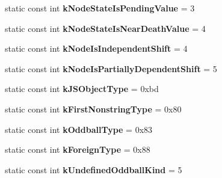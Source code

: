 \begin{DoxyCompactItemize}
\item 
\hypertarget{classv8_1_1internal_1_1Internals_a843b53b17257ecd957eade0d9f21c5ab}{}static const int {\bfseries k\+Node\+State\+Is\+Pending\+Value} = 3\label{classv8_1_1internal_1_1Internals_a843b53b17257ecd957eade0d9f21c5ab}

\item 
\hypertarget{classv8_1_1internal_1_1Internals_a18f3e757639b07bdabb8cda7dd4a8bdb}{}static const int {\bfseries k\+Node\+State\+Is\+Near\+Death\+Value} = 4\label{classv8_1_1internal_1_1Internals_a18f3e757639b07bdabb8cda7dd4a8bdb}

\item 
\hypertarget{classv8_1_1internal_1_1Internals_a228b2b58c77c17bc512b92d9e3aea48b}{}static const int {\bfseries k\+Node\+Is\+Independent\+Shift} = 4\label{classv8_1_1internal_1_1Internals_a228b2b58c77c17bc512b92d9e3aea48b}

\item 
\hypertarget{classv8_1_1internal_1_1Internals_aeda4d6fc1bd10ca57398597f3bb496f3}{}static const int {\bfseries k\+Node\+Is\+Partially\+Dependent\+Shift} = 5\label{classv8_1_1internal_1_1Internals_aeda4d6fc1bd10ca57398597f3bb496f3}

\item 
\hypertarget{classv8_1_1internal_1_1Internals_a56b7062df5d9a7df491137d4c3341bcc}{}static const int {\bfseries k\+J\+S\+Object\+Type} = 0xbd\label{classv8_1_1internal_1_1Internals_a56b7062df5d9a7df491137d4c3341bcc}

\item 
\hypertarget{classv8_1_1internal_1_1Internals_a6f4a54927b01a11f444fb2f00b47ca1d}{}static const int {\bfseries k\+First\+Nonstring\+Type} = 0x80\label{classv8_1_1internal_1_1Internals_a6f4a54927b01a11f444fb2f00b47ca1d}

\item 
\hypertarget{classv8_1_1internal_1_1Internals_a13081e936f8c96472f1b1496c70d4dc1}{}static const int {\bfseries k\+Oddball\+Type} = 0x83\label{classv8_1_1internal_1_1Internals_a13081e936f8c96472f1b1496c70d4dc1}

\item 
\hypertarget{classv8_1_1internal_1_1Internals_a263195f36f9e8ee64af70dc267a85d55}{}static const int {\bfseries k\+Foreign\+Type} = 0x88\label{classv8_1_1internal_1_1Internals_a263195f36f9e8ee64af70dc267a85d55}

\item 
\hypertarget{classv8_1_1internal_1_1Internals_a39072b9e0ffea4031f4a1c514208b20d}{}static const int {\bfseries k\+Undefined\+Oddball\+Kind} = 5\label{classv8_1_1internal_1_1Internals_a39072b9e0ffea4031f4a1c514208b20d}


\end{DoxyCompactItemize}
